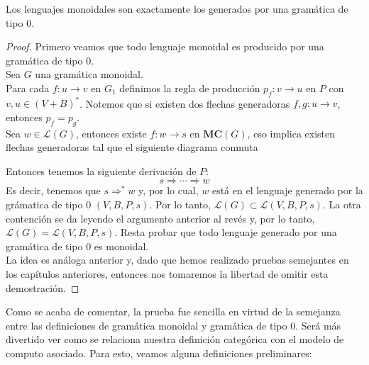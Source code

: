 \documentclass[../main.tex]{subfiles}
\begin{document}
	\begin{thm}
	Los lenguajes monoidales son exactamente los generados por una gramática de tipo 0. 
	\end{thm}
	\begin{proof}
	Primero veamos que todo lenguaje monoidal es producido por una gramática de tipo 0. \\
	Sea $G$ una gramática monoidal. \\
	Para cada $f:u \to v$ en $G_1$ definimos la regla de producción $p_f: v \rightarrow u$ en $P$ con $v,u \in (V+B)^*$. Notemos que si existen dos flechas generadoras $f,g: u \to v$, entonces $p_f=p_g$.  \\
	Sea $w \in \mathcal{L}(G)$, entonces existe $f:w \to s$ en $\textbf{MC}(G)$, eso implica existen flechas generadoras tal que el siguiente diagrama conmuta

	\begin{center}
	\end{center}
	 Entonces tenemos la siguiente derivación de $P$:
	 \[
	 	s \Rightarrow \cdots \Rightarrow w
	 \]
	 Es decir, tenemos que $s \Rightarrow^* w$ y, por lo cual, $w$ está en el lenguaje generado por la grámatica de tipo 0 $(V,B,P,s)$. Por lo tanto, $\mathcal{L}(G)\subset \mathcal{L}(V,B,P,s)$. La otra contención se da leyendo el argumento anterior al revés y, por lo tanto, $\mathcal{L}(G) = \mathcal{L}(V,B,P,s)$.
	 Resta probar que todo lenguaje generado por una gramática de tipo 0 es monoidal.\\
	 La idea es análoga anterior y, dado que hemos realizado pruebas semejantes en los capítulos anteriores, entonces nos tomaremos la libertad de omitir esta demostración.
	\end{proof}
	
	\begin{ej}
		
	\end{ej}
	
	Como se acaba de comentar, la prueba fue sencilla en virtud de la semejanza entre las definiciones de gramática monoidal y gramática de tipo 0. Será más divertido ver como se relaciona nuestra definición categórica con el modelo de computo asociado. Para esto, veamos alguna definiciones preliminares: 
	
\end{document}
